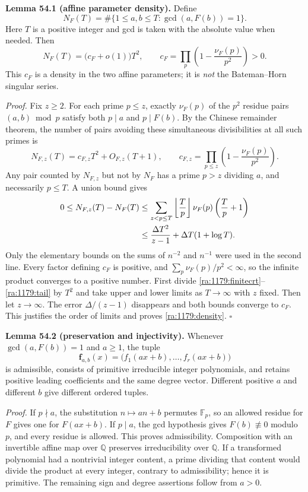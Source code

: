\documentclass[11pt]{article}
\newcommand{\Q}{\mathbb{Q}}
\newcommand{\F}{\mathbb{F}}
\begin{document}
\textbf{Lemma 54.1 (affine parameter density).} Define
\[
 N_F(T)=\#\{1\le a,b\le T:\gcd(a,F(b))=1\}.
\]
Here $T$ is a positive integer and gcd is taken with the absolute value
when needed. Then
\begin{equation}\label{ra:1179:density}
 N_F(T)=\bigl(c_F+o(1)\bigr)T^2,
 \qquad
 c_F=\prod_p\left(1-\frac{\nu_F(p)}{p^2}\right)>0.
\end{equation}
This $c_F$ is a density in the two affine parameters; it is \emph{not}
the Bateman--Horn singular series.

\textit{Proof.} Fix $z\ge2$. For each prime $p\le z$, exactly
$\nu_F(p)$ of the $p^2$ residue pairs $(a,b)\bmod p$ satisfy both
$p\mid a$ and $p\mid F(b)$. By the Chinese remainder theorem, the number
of pairs avoiding these simultaneous divisibilities at all such primes is
\begin{equation}\label{ra:1179:finitecrt}
 N_{F,z}(T)=c_{F,z}T^2+O_{F,z}(T+1),\qquad
 c_{F,z}=\prod_{p\le z}\left(1-\frac{\nu_F(p)}{p^2}\right).
\end{equation}
Any pair counted by $N_{F,z}$ but not by $N_F$ has a prime $p>z$
dividing $a$, and necessarily $p\le T$. A union bound gives
\begin{align}
 0\le N_{F,z}(T)-N_F(T)
 &\le\sum_{z<p\le T}\left\lfloor\frac{T}{p}\right\rfloor
       \nu_F(p)\left(\frac{T}{p}+1\right)\notag\\
 &\le\frac{\Delta T^2}{z-1}
       +\Delta T(1+\log T).\label{ra:1179:tail}
\end{align}
Only the elementary bounds on the sums of $n^{-2}$ and $n^{-1}$ were
used in the second line. Every factor defining $c_F$ is positive, and
$\sum_p\nu_F(p)/p^2<\infty$, so the infinite product converges to a
positive number. First divide \eqref{ra:1179:finitecrt}--\eqref{ra:1179:tail}
by $T^2$ and take upper and lower limits as $T\to\infty$ with $z$ fixed.
Then let $z\to\infty$. The error $\Delta/(z-1)$ disappears and both
bounds converge to $c_F$. This justifies the order of limits and proves
\eqref{ra:1179:density}. \hfill$\square$

\textbf{Lemma 54.2 (preservation and injectivity).} Whenever
$\gcd(a,F(b))=1$ and $a\ge1$, the tuple
\[
 \mathbf f_{a,b}(x)=\bigl(f_1(ax+b),\ldots,f_r(ax+b)\bigr)
\]
is admissible, consists of primitive irreducible integer polynomials,
and retains positive leading coefficients and the same degree vector.
Different positive $a$ and different $b$ give different ordered tuples.

\textit{Proof.} If $p\nmid a$, the substitution $n\mapsto an+b$
permutes $\F_p$, so an allowed residue for $F$ gives one for
$F(ax+b)$. If $p\mid a$, the gcd hypothesis gives $F(b)\not\equiv0$
modulo $p$, and every residue is allowed. This proves admissibility.
Composition with an invertible affine map over $\Q$ preserves
irreducibility over $\Q$. If a transformed polynomial had a nontrivial
integer content, a prime dividing that content would divide the product
at every integer, contrary to admissibility; hence it is primitive.
The remaining sign and degree assertions follow from $a>0$.
\end{document}
